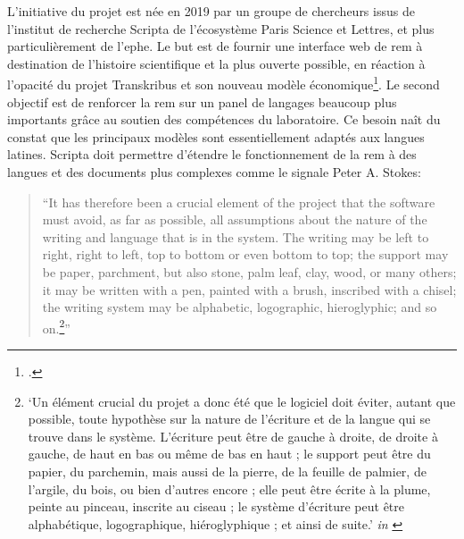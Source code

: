 	L'initiative du projet est née en 2019 par un groupe de chercheurs issus de l'institut de recherche Scripta de l'écosystème Paris Science et Lettres, et plus particulièrement de l'\gls{ephe}. Le but est de fournir une interface web de \gls{rem} à destination de l'histoire scientifique et la plus ouverte possible, en réaction à l'opacité du projet Transkribus et son nouveau modèle économique\footcite{kiesslingEScriptoriumOpenSource2019}. Le second objectif est de renforcer la \gls{rem} sur un panel de langages beaucoup plus importants grâce au soutien des compétences du laboratoire. Ce besoin naît du constat que les principaux modèles sont essentiellement adaptés aux langues latines. Scripta doit permettre d'étendre le fonctionnement de la \gls{rem} à des langues et des documents plus complexes comme le signale Peter A. Stokes:
	
	\begin{quote}
	    \enquote{It has therefore been a crucial element of the project that the software must avoid, as far as possible, all assumptions about the nature of the writing and language that is in the system. The writing may be left to right, right to left, top to bottom or even bottom to top; the support may be paper, parchment, but also stone, palm leaf, clay, wood, or many others; it may be written with a pen, painted with a brush, inscribed with a chisel; the writing system may be alphabetic, logographic, hieroglyphic; and so on.\footnote{\enquote{Un élément crucial du projet a donc été que le logiciel doit éviter, autant que possible, toute hypothèse sur la nature de l'écriture et de la langue qui se trouve dans le système. L'écriture peut être de gauche à droite, de droite à gauche, de haut en bas ou même de bas en haut ; le support peut être du papier, du parchemin, mais aussi de la pierre, de la feuille de palmier, de l'argile, du bois, ou bien d'autres encore ; elle peut être écrite à la plume, peinte au pinceau, inscrite au ciseau ; le système d'écriture peut être alphabétique, logographique, hiéroglyphique ; et ainsi de suite.} \textit{in} \cite{stokesEScriptoriumVREManuscript}}}
	\end{quote}
	
